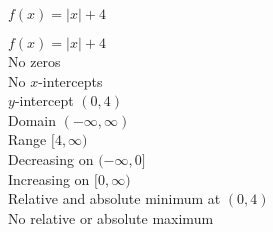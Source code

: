 {$f(x) = |x| + 4$}
{$f(x) = |x| + 4$ \\ No zeros \\ No $x$-intercepts \\ $y$-intercept $(0, 4)$ \\ Domain $(-\infty, \infty)$ \\ Range $[4, \infty)$ \\ Decreasing on $(-\infty, 0]$ \\ Increasing on $[0, \infty)$ \\ Relative and absolute minimum at $(0, 4)$ \\ No relative or absolute maximum 

\begin{center}
\end{center}}